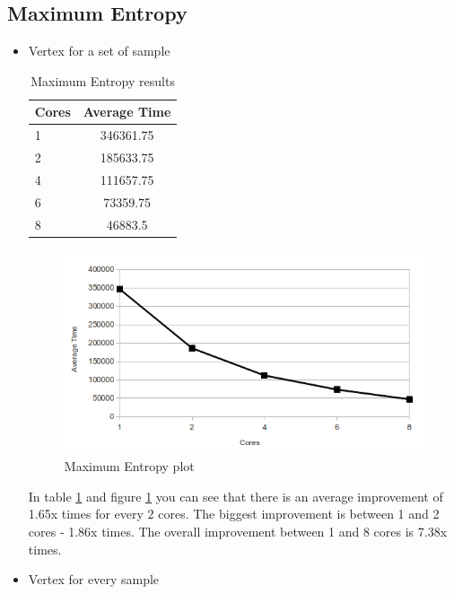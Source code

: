\documentclass{report}
\begin{document}
\subsection{Maximum Entropy}

\begin{itemize}

\item{Vertex for a set of sample}

\begin{table}[ht]
\centering
\begin{tabular}{ l c }
    \hline\hline
    Cores & Average Time \\ [0.2ex]
    \hline
    1 & 346361.75 \\
    2 & 185633.75  \\
    4 &111657.75  \\
    6 & 73359.75  \\
    8 & 46883.5  \\
    \hline
  \end{tabular}
\label{table:maxentres1}
\caption{Maximum Entropy results}
\end{table}

\begin{figure}[!htb]
  \centering
  \includegraphics*[scale=0.70]{maxent_plot.png}
  \caption{Maximum Entropy plot}
  \label{fig:maxent_plot}
\end{figure}

In table \ref{table:maxentres1} and figure \ref{fig:maxent_plot} you can see that there is an average improvement of 1.65x times for every 2 cores. The biggest improvement is between 1 and 2 cores - 1.86x times. The overall improvement between 1 and 8 cores is 7.38x times.

\item{Vertex for every sample}


\end{itemize}
\end{document}
